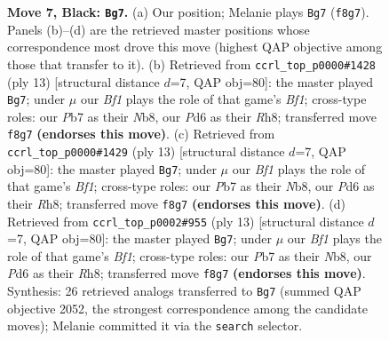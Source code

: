 \documentclass[11pt]{article}
\begin{document}
\begin{figure}[p]
\caption{\textbf{Move 7, Black: \texttt{Bg7}.} (a) Our position; Melanie plays \texttt{Bg7} (\texttt{f8g7}). Panels (b)--(d) are the retrieved master positions whose correspondence most drove this move (highest QAP objective among those that transfer to it). (b) Retrieved from \texttt{ccrl\_top\_p0000\#1428} (ply 13) [structural distance $d$=7, QAP obj=80]: the master played \texttt{Bg7}; under $\mu$ our \emph{Bf1} plays the role of that game's \emph{Bf1}; cross-type roles: our \emph{P}b7 as their \emph{N}b8, our \emph{P}d6 as their \emph{R}h8; transferred move \texttt{f8g7} \textbf{(endorses this move)}. (c) Retrieved from \texttt{ccrl\_top\_p0000\#1429} (ply 13) [structural distance $d$=7, QAP obj=80]: the master played \texttt{Bg7}; under $\mu$ our \emph{Bf1} plays the role of that game's \emph{Bf1}; cross-type roles: our \emph{P}b7 as their \emph{N}b8, our \emph{P}d6 as their \emph{R}h8; transferred move \texttt{f8g7} \textbf{(endorses this move)}. (d) Retrieved from \texttt{ccrl\_top\_p0002\#955} (ply 13) [structural distance $d$=7, QAP obj=80]: the master played \texttt{Bg7}; under $\mu$ our \emph{Bf1} plays the role of that game's \emph{Bf1}; cross-type roles: our \emph{P}b7 as their \emph{N}b8, our \emph{P}d6 as their \emph{R}h8; transferred move \texttt{f8g7} \textbf{(endorses this move)}. Synthesis: 26 retrieved analogs transferred to \texttt{Bg7} (summed QAP objective 2052, the strongest correspondence among the candidate moves); Melanie committed it via the \texttt{search} selector.}
\label{fig:thought-m13}
\end{figure}

\clearpage
\end{document}

